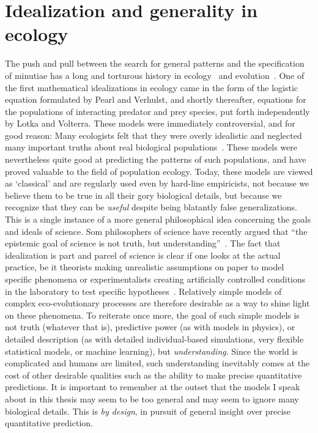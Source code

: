 \section{Idealization and generality in ecology}\label{idealization}
The push and pull between the search for general patterns and the specification of minutiae has a long and torturous history in ecology~\citep{kingsland_modeling_1985} and evolution~\citep{provine_origins_2001}. One of the first mathematical idealizations in ecology came in the form of the logistic equation formulated by Pearl and Verhulst, and shortly thereafter, equations for the populations of interacting predator and prey species, put forth independently by Lotka and Volterra. These models were immediately controversial, and for good reason: Many ecologists felt that they were overly idealistic and neglected many important truths about real biological populations~\citep{kingsland_modeling_1985}. These models were nevertheless quite good at predicting the patterns of such populations, and have proved valuable to the field of population ecology. Today, these models are viewed as `classical' and are regularly used even by hard-line empiricists, not because we believe them to be true in all their gory biological details, but because we recognize that they can be \emph{useful} despite being blatantly false generalizations. This is a single instance of a more general philosophical idea concerning the goals and ideals of science. Som philosophers of science have recently argued that ``the epistemic goal of science is not truth, but understanding''~\citep{potochnik_idealization_2018}. The fact that idealization is part and parcel of science is clear if one looks at the actual practice, be it theorists making unrealistic assumptions on paper to model specific phenomena or experimentalists creating artificially controlled conditions in the laboratory to test specific hypotheses~\citep{zuk_models_2018}. Relatively simple models of complex eco-evolutionary processes are therefore desirable as a way to shine light on these phenomena. To reiterate once more, the goal of such simple models is not truth (whatever that is), predictive power (as with models in physics), or detailed description (as with detailed individual-based simulations, very flexible statistical models, or machine learning), but \emph{understanding}. Since the world is complicated and humans are limited, such understanding inevitably comes at the cost of other desirable qualities such as the ability to make precise quantitative predictions. It is important to remember at the outset that the models I speak about in this thesis may seem to be too general and may seem to ignore many biological details. This is \textit{by design}, in pursuit of general insight over precise quantitative prediction.

